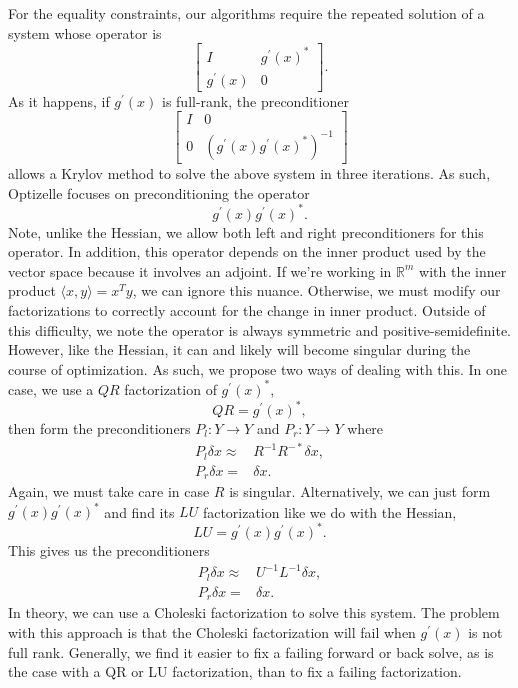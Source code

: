 \documentclass{report}
\newcommand{\re}{\mathbb{R}}
\begin{document}
        For the equality constraints, our algorithms require the repeated solution of a system whose operator is
$$\begin{bmatrix}
        I & g^\prime(x)^*\\
        g^\prime(x) & 0
\end{bmatrix}.$$
As it happens, if $g^\prime(x)$ is full-rank, the preconditioner
$$\begin{bmatrix}
        I & 0\\
        0 & (g^\prime(x)g^\prime(x)^*)^{-1}
\end{bmatrix}$$
allows a Krylov method to solve the above system in three iterations.  As such, Optizelle focuses on preconditioning the operator
$$
        g^\prime(x)g^\prime(x)^*.
$$
Note, unlike the Hessian, we allow both left and right preconditioners for this operator.  In addition, this operator depends on the inner product used by the vector space because it involves an adjoint.  If we're working in $\re^m$ with the inner product $\langle x,y\rangle = x^Ty$, we can ignore this nuance.  Otherwise, we must modify our factorizations to correctly account for the change in inner product.  Outside of this difficulty, we note the operator is always symmetric and positive-semidefinite.  However, like the Hessian, it can and likely will become singular during the course of optimization.  As such, we propose two ways of dealing with this.  In one case, we use a $QR$ factorization of $g^\prime(x)^*$,
$$
        Q R = g^\prime(x)^*,
$$
then form the preconditioners $P_l: Y\rightarrow Y$ and $P_r: Y\rightarrow Y$ where
\begin{align*}
    P_l \delta x \approx& R^{-1}R^{-*}\delta x,\\
    P_r \delta x =& \delta x .
\end{align*}
Again, we must take care in case $R$ is singular.  Alternatively, we can just form $g^\prime(x)g^\prime(x)^*$ and find its $LU$ factorization like we do with the Hessian,
$$
        LU = g^\prime(x)g^\prime(x)^*.
$$
This gives us the preconditioners
\begin{align*}
        P_l\delta x \approx & U^{-1}L^{-1} \delta x,\\
        P_r\delta x = & \delta x.
\end{align*}
In theory, we can use a Choleski factorization to solve this system.  The problem with this approach is that the Choleski factorization will fail when $g^\prime(x)$ is not full rank.  Generally, we find it easier to fix a failing forward or back solve, as is the case with a QR or LU factorization, than to fix a failing factorization.
\end{document}
